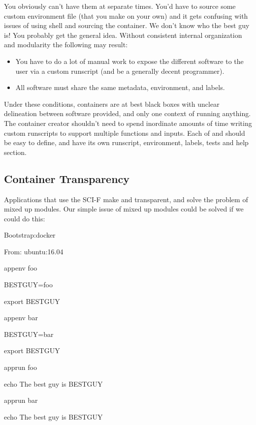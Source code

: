 \documentclass[letterpaper,10pt,english]{sphinxmanual}
\begin{document}
You obviously can’t have them at separate times. You’d have to source
some custom environment file (that you make on your own) and it gets
confusing with issues of using shell and sourcing the container. We don’t know who
the best guy is! You probably get the general idea. Without consistent internal
organization and modularity the following may result:
\begin{itemize}
\item {} 
You have to do a lot of manual work to expose the different software
to the user via a custom runscript (and be a generally decent
programmer).

\item {} 
All software must share the same metadata, environment, and labels.

\end{itemize}

Under these conditions, containers are at best black boxes with unclear
delineation between software provided, and only one context of running
anything. The container creator shouldn’t need to spend inordinate
amounts of time writing custom runscripts to support multiple functions
and inputs. Each of  and  should be easy to define, and have its own
runscript, environment, labels, tests and help section.


\subsection{Container Transparency}
\label{\detokenize{reproducible_scif_apps:container-transparency}}
Applications that use the SCI-F make  and  transparent, and solve the problem of mixed up
modules. Our simple issue of mixed up modules could be solved if we
could do this:

%
\begin{sphinxVerbatim}[commandchars=\\\{\}]
Bootstrap:docker

From: ubuntu:16.04


\PYGZpc{}appenv foo

    BEST\PYGZus{}GUY=foo

    export BEST\PYGZus{}GUY


\PYGZpc{}appenv bar

    BEST\PYGZus{}GUY=bar

    export BEST\PYGZus{}GUY


\PYGZpc{}apprun foo

    echo The best guy is \PYGZdl{}BEST\PYGZus{}GUY


\PYGZpc{}apprun bar

    echo The best guy is \PYGZdl{}BEST\PYGZus{}GUY
\end{sphinxVerbatim}
\end{document}
